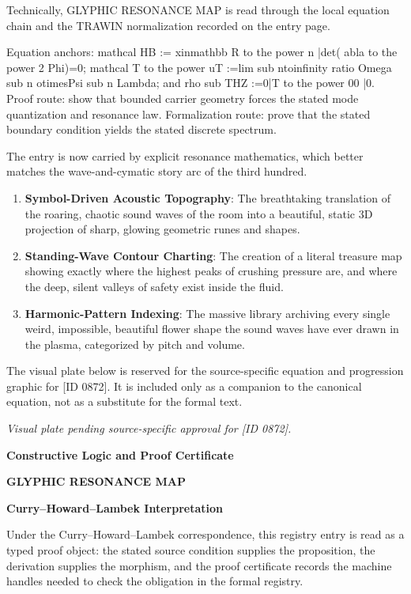 Technically, GLYPHIC RESONANCE MAP is read through the local equation chain and the TRAWIN normalization recorded on the entry page.

Equation anchors: mathcal HB := xinmathbb R to the power n |det( abla to the power 2 Phi)=0; mathcal T to the power uT :=lim sub ntoinfinity ratio Omega sub n otimesPsi sub n Lambda; and rho sub THZ :=0|T to the power 00 |0. Proof route: show that bounded carrier geometry forces the stated mode quantization and resonance law. Formalization route: prove that the stated boundary condition yields the stated discrete spectrum.

The entry is now carried by explicit resonance mathematics, which better matches the wave-and-cymatic story arc of the third hundred.
\endgroup

\begin{enumerate}[leftmargin=1.6em,itemsep=6pt,topsep=4pt]
\item \textbf{Symbol-Driven Acoustic Topography}: The breathtaking translation of the roaring, chaotic sound waves of the room into a beautiful, static 3D projection of sharp, glowing geometric runes and shapes.
\item \textbf{Standing-Wave Contour Charting}: The creation of a literal treasure map showing exactly where the highest peaks of crushing pressure are, and where the deep, silent valleys of safety exist inside the fluid.
\item \textbf{Harmonic-Pattern Indexing}: The massive library archiving every single weird, impossible, beautiful flower shape the sound waves have ever drawn in the plasma, categorized by pitch and volume.
\end{enumerate}

\begingroup\footnotesize\sloppy
The visual plate below is reserved for the source-specific equation and progression graphic for [ID 0872]. It is included only as a companion to the canonical equation, not as a substitute for the formal text.
\par\endgroup
\begingroup\footnotesize\itshape
Visual plate pending source-specific approval for [ID 0872].
\par\endgroup

\clearpage
\begingroup\tzpsupportsetup
\noindent\textbf{\fontsize{10.8pt}{12.8pt}\selectfont [ID 0872] Constructive Logic and Proof Certificate}\par
\noindent\textbf{\fontsize{10pt}{12pt}\selectfont GLYPHIC RESONANCE MAP}\par
\vspace{0.45em}
\begingroup
\footnotesize
\setlength{\parskip}{0.22em}
\setlength{\parindent}{0pt}
\noindent\textbf{Curry--Howard--Lambek Interpretation}\par
Under the Curry--Howard--Lambek correspondence, this registry entry is read as a typed proof
object: the stated source condition supplies the proposition, the derivation supplies the
morphism, and the proof certificate records the machine handles needed to check the obligation
in the formal registry.

